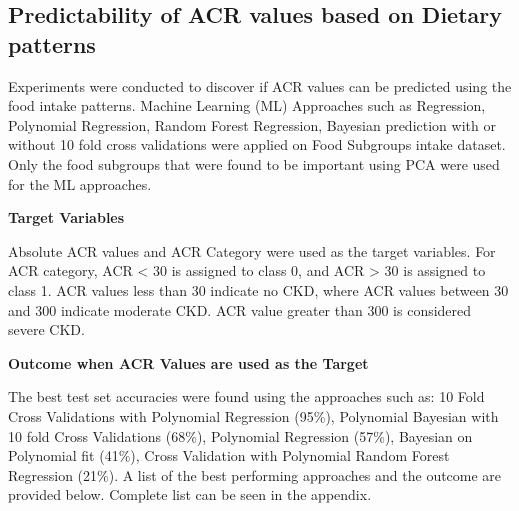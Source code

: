 \subsection{\textbf{Predictability of ACR values based on Dietary patterns}}
Experiments were conducted to discover if ACR values can be predicted using the food intake patterns. Machine Learning (ML) Approaches such as Regression, Polynomial Regression, Random Forest Regression, Bayesian prediction with or without 10 fold cross validations were applied on Food Subgroups intake dataset. Only the food subgroups that were found to be important using PCA were used for the ML approaches.

\medskip 
\noindent \textbf{Target Variables}


\noindent Absolute ACR values and ACR Category were used as the target variables.  For ACR category, ACR < 30 is assigned to class 0, and ACR > 30 is assigned to class 1. ACR values less than 30 indicate no CKD, where ACR values between 30 and 300 indicate moderate CKD. ACR value greater than 300 is considered severe CKD.

\medskip 
\noindent \textbf{Outcome when ACR Values are used as the Target }


\noindent The best test set accuracies were found using the approaches such as: 10 Fold Cross Validations with Polynomial Regression (95\%), Polynomial Bayesian with 10 fold Cross Validations (68\%), Polynomial Regression (57\%), Bayesian on Polynomial fit (41\%), Cross Validation with Polynomial Random Forest Regression (21\%). A list of the best performing approaches and the outcome are provided below. Complete list can be seen in the appendix. 

\medskip

